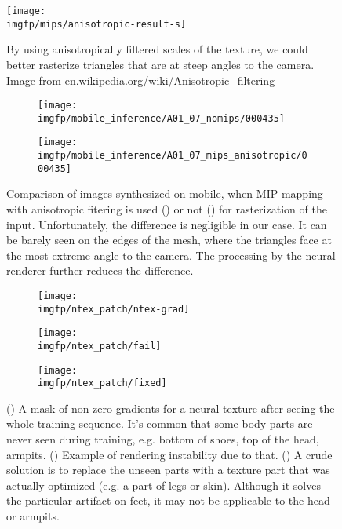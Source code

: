 \begin{figure}
	\centering
	\texttt{[image: \\imgfp/mips/anisotropic-result-s]}
	\caption{By using anisotropically filtered scales of the texture, we could better rasterize triangles that are at steep angles to the camera. Image from \href{https://en.wikipedia.org/wiki/Anisotropic_filtering}{en.wikipedia.org/wiki/Anisotropic\_filtering}}
	\label{fig:anisotropic_result}
\end{figure}
\begin{figure}
	\centering
	\begin{subfigure}[b]{0.49\textwidth}
		\centering
		\texttt{[image: \\imgfp/mobile\_inference/A01\_07\_nomips/000435]}%
		\caption{}
		\label{fig:no_mipmap_inference}
	\end{subfigure}
	\hfill
	\begin{subfigure}[b]{0.49\textwidth}
		\centering
		\texttt{[image: \\imgfp/mobile\_inference/A01\_07\_mips\_anisotropic/000435]}
		\caption{}
		\label{fig:anisotropic_inference}
	\end{subfigure}
	\caption{Comparison of images synthesized on mobile, when MIP mapping with anisotropic fitering is used (\protect{}) or not (\protect{}) for rasterization of the input. Unfortunately, the difference is negligible in our case. It can be barely seen on the edges of the mesh, where the triangles face at the most extreme angle to the camera. The processing by the neural renderer further reduces the difference.}
\end{figure}
\begin{figure}
	\centering
	\begin{subfigure}[b]{0.35\textwidth}
		\centering
		\texttt{[image: \\imgfp/ntex\_patch/ntex-grad]}%
		\caption{}
		\label{fig:ntex-grad}
	\end{subfigure}
	\hfill
	\begin{subfigure}[b]{0.3\textwidth}
		\centering
		\texttt{[image: \\imgfp/ntex\_patch/fail]}
		\caption{}
		\label{fig:ntex-artifact}
	\end{subfigure}
	\hfill
	\begin{subfigure}[b]{0.3\textwidth}
		\centering
		\texttt{[image: \\imgfp/ntex\_patch/fixed]}
		\caption{}
		\label{fig:ntex-fixed}
	\end{subfigure}
	\caption{(\protect{}) A mask of non-zero gradients for a neural texture after seeing the whole training sequence. It's common that some body parts are never seen during training, e.g. bottom of shoes, top of the head, armpits. (\protect{}) Example of rendering instability due to that. (\protect{}) A crude solution is to replace the unseen parts with a texture part that was actually optimized (e.g. a part of legs or skin). Although it solves the particular artifact on feet, it may not be applicable to the head or armpits.}
\end{figure}
